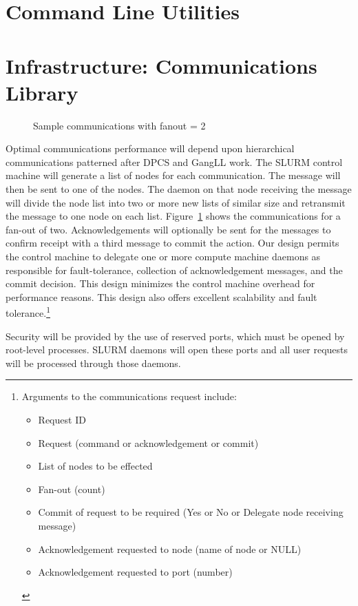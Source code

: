 \section{Command Line Utilities}

\section{Infrastructure: Communications Library}

\begin{figure}[htb]
\centerline{}
\caption{Sample communications with fanout = 2}
\label{communicate}
\end{figure}
Optimal communications performance will depend upon hierarchical communications
patterned after DPCS and GangLL work. The SLURM control machine will generate a
list of nodes for each communication. The message will then be sent to one of
the nodes. 
The daemon on that node receiving the message will divide the node list into
two or more new lists of similar size and retransmit the message to one node on
each list. Figure~\ref{communicate} shows the communications for a fan-out of 
two.  Acknowledgements will optionally be sent for the messages to confirm 
receipt with a third message to commit the action. Our design permits the 
control machine to delegate one or more compute machine daemons as responsible 
for fault-tolerance, collection of acknowledgement messages, and the commit
decision. This design minimizes the control machine overhead for performance
reasons. This design also offers excellent scalability and fault 
tolerance.\footnote{Arguments to the communications request include:
\begin{itemize}
\item Request ID
\item Request (command or acknowledgement or commit)
\item List of nodes to be effected
\item Fan-out (count)
\item Commit of request to be required (Yes or No or Delegate node receiving
      message) 
\item Acknowledgement requested to node (name of node or NULL)
\item Acknowledgement requested to port (number)
\end{itemize} }

Security will be provided by the use of reserved ports, which must be opened by
root-level processes. SLURM daemons will open these ports and all user requests
will be processed through those daemons. 


